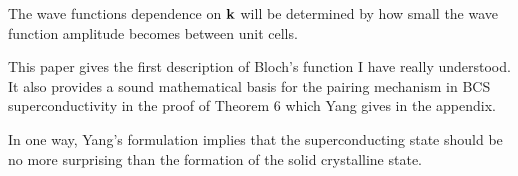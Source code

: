 The wave functions dependence on ${\bf k}$ will be determined by how small 
the wave function amplitude becomes between unit cells.

This paper gives the first description of Bloch's function I have really understood. 
It also provides a sound mathematical basis for the pairing mechanism in BCS
superconductivity in the proof of Theorem 6 which Yang gives in the appendix.

In one way, Yang's formulation implies that the superconducting state
should be no more surprising than the formation of the solid crystalline state.

